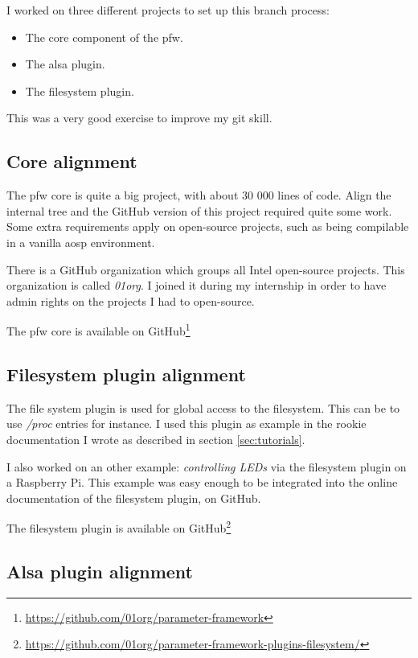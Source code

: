 I worked on three different projects to set up this branch process:
\begin{itemize}
    \item The core component of the \gls{pfw}.
    \item The \gls{alsa} plugin.
    \item The filesystem plugin.
\end{itemize}

This was a very good exercise to improve my \gls{git} skill.

\subsection{Core alignment}
The \gls{pfw} core is quite a big project, with about 30 000 lines of code.
Align the internal tree and the \gls{GitHub} version of this project required quite some work.
Some extra requirements apply on open-source projects, such as being compilable in a vanilla \gls{aosp} environment.

There is a \gls{GitHub} organization which groups all Intel open-source projects. This
organization is called \emph{01org}. I joined it during my internship in order to have admin rights
on the projects I had to open-source.

The \gls{pfw} core is available on \gls{GitHub}\footnote{\url{https://github.com/01org/parameter-framework}}

\subsection{Filesystem plugin alignment}

The file system plugin is used for global access to the filesystem. This can be to
use \emph{/proc} entries for instance. I used this plugin as example in the rookie
documentation I wrote as described in section \ref{sec:tutorials}.

I also worked on an other example: \emph{controlling LEDs} via the filesystem
plugin on a Raspberry Pi.  This example was easy enough to be integrated into
the online documentation of the filesystem plugin, on \gls{GitHub}.

The filesystem plugin is available on \gls{GitHub}\footnote{\url{https://github.com/01org/parameter-framework-plugins-filesystem/}}

\subsection{Alsa plugin alignment}


